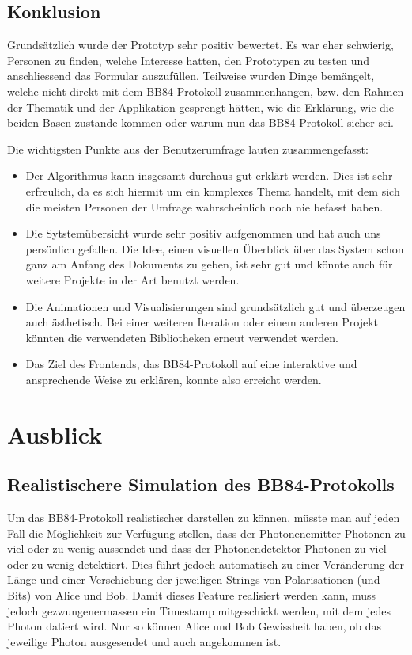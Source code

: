 \documentclass[a4paper,10.2pt,pdftex]{scrartcl}%
\begin{document}
\subsection{Konklusion}
Grundsätzlich wurde der Prototyp sehr positiv bewertet. Es war eher schwierig, Personen zu finden, welche Interesse hatten, den Prototypen zu testen und anschliessend das Formular auszufüllen. Teilweise wurden Dinge bemängelt, welche nicht direkt mit dem BB84-Protokoll zusammenhangen, bzw. den Rahmen der Thematik und der Applikation gesprengt hätten, wie die Erklärung, wie die beiden Basen zustande kommen oder warum nun das BB84-Protokoll sicher sei.

Die wichtigsten Punkte aus der Benutzerumfrage lauten zusammengefasst:

\begin{itemize}
\item Der Algorithmus kann insgesamt durchaus gut erklärt werden. Dies ist sehr erfreulich, da es sich hiermit um ein komplexes Thema handelt, mit dem sich die meisten Personen der Umfrage wahrscheinlich noch nie befasst haben.
\item Die Sytstemübersicht wurde sehr positiv aufgenommen und hat auch uns persönlich gefallen. Die Idee, einen visuellen Überblick über das System schon ganz am Anfang des Dokuments zu geben, ist sehr gut und könnte auch für weitere Projekte in der Art benutzt werden.
\item Die Animationen und Visualisierungen sind grundsätzlich gut und überzeugen auch ästhetisch. Bei einer weiteren Iteration oder einem anderen Projekt könnten die verwendeten Bibliotheken erneut verwendet werden.
\item Das Ziel des Frontends, das BB84-Protokoll auf eine interaktive und ansprechende Weise zu erklären, konnte also erreicht werden. 
\end{itemize}


\section{Ausblick}
\subsection{ Realistischere Simulation des BB84-Protokolls}

Um das BB84-Protokoll realistischer darstellen zu können, müsste man auf jeden Fall die Möglichkeit zur Verfügung stellen, dass der Photonenemitter Photonen zu viel oder zu wenig aussendet und dass der Photonendetektor Photonen zu viel oder zu wenig detektiert. Dies führt jedoch automatisch zu einer Veränderung der Länge und einer Verschiebung der jeweiligen Strings von Polarisationen (und Bits) von Alice und Bob. Damit dieses Feature realisiert werden kann, muss jedoch gezwungenermassen ein Timestamp mitgeschickt werden, mit dem jedes Photon datiert wird. Nur so können Alice und Bob Gewissheit haben, ob das jeweilige Photon ausgesendet und auch angekommen ist.
\end{document}
